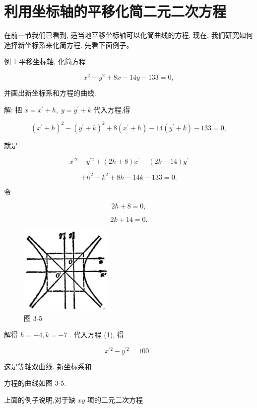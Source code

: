 \documentclass[lang=cn,newtx,12pt,scheme=chinese]{elegantbook}
\begin{document}
\section{利用坐标轴的平移化简二元二次方程}

在前一节我们已看到, 适当地平移坐标轴可以化简曲线的方程. 现在, 我们研究如何选择新坐标系来化简方程. 先看下面例子。

例 1 平移坐标轴, 化简方程

\[
    {x}^{2} - {y}^{2} + {8x} - {14y} - {133} = 0,
\]

并画出新坐标系和方程的曲线.

解: 把 \(x = {x}^{\prime } + h,\;y = {y}^{\prime } + k\) 代入方程,得

\[
    {\left( {x}^{\prime } + h\right) }^{2} - {\left( {y}^{\prime } + k\right) }^{2} + 8\left( {{x}^{\prime } + h}\right) - {14}\left( {{y}^{\prime } + k}\right) - {133} = 0,
\]

就是

\[
    {x}^{\prime 2} - {y}^{\prime 2} + \left( {{2h} + 8}\right) {x}^{\prime } - \left( {{2k} + {14}}\right) {y}^{\prime }
\]

\[
  + {h}^{2} - {k}^{2} + {8h} - {14k} - {133} = 0. \tag{1}
\]

令

\[
    {2h} + 8 = 0,
\]

\[
    {2k} + {14} = 0\text{.}
\]

\begin{figure}[h]
  \centering
  \includegraphics[max width=0.4\textwidth]{images/01912cc2-ffb6-728e-9ae7-b113ff05c64b_136_802845.jpg}
  \caption{图 3-5}
\end{figure}

解得 \(h = - 4,k = - 7\) . 代入方程 (1), 得

\[
    {x}^{\prime 2} - {y}^{\prime 2} = {100}\text{. }
\]

这是等轴双曲线. 新坐标系和

方程的曲线如图 3-5.

上面的例子说明,对于缺 \({xy}\) 项的二元二次方程
\end{document}
